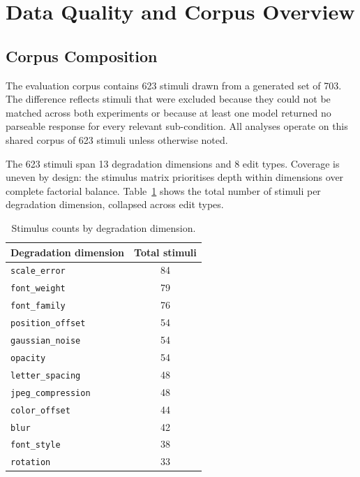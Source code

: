 \section{Data Quality and Corpus Overview} \label{sec:data-quality}

\subsection{Corpus Composition}

The evaluation corpus contains 623 stimuli drawn from a generated set of 703. The difference reflects stimuli that were excluded because they could not be matched across both experiments or because at least one model returned no parseable response for every relevant sub-condition. All analyses operate on this shared corpus of 623 stimuli unless otherwise noted.

The 623 stimuli span 13 degradation dimensions and 8 edit types. Coverage is uneven by design: the stimulus matrix prioritises depth within dimensions over complete factorial balance. Table~\ref{tab:corpus-coverage} shows the total number of stimuli per degradation dimension, collapsed across edit types.

\begin{table}[htbp]
\centering
\caption{Stimulus counts by degradation dimension.}
\label{tab:corpus-coverage}
\begin{tabular}{lc}
\toprule
Degradation dimension & Total stimuli \\
\midrule
\texttt{scale\_error}       & 84 \\
\texttt{font\_weight}       & 79 \\
\texttt{font\_family}       & 76 \\
\texttt{position\_offset}   & 54 \\
\texttt{gaussian\_noise}    & 54 \\
\texttt{opacity}            & 54 \\
\texttt{letter\_spacing}    & 48 \\
\texttt{jpeg\_compression}  & 48 \\
\texttt{color\_offset}      & 44 \\
\texttt{blur}               & 42 \\
\texttt{font\_style}        & 38 \\
\texttt{rotation}           & 33 \\
\bottomrule
\end{tabular}
\end{table}

